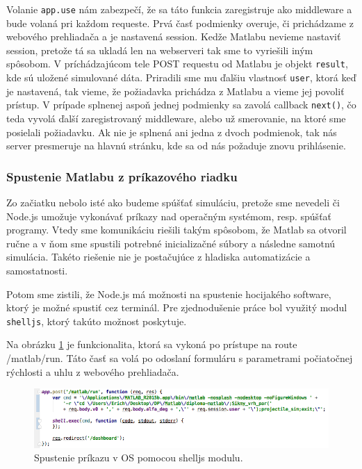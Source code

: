 Volanie \verb|app.use| nám zabezpečí, že sa táto funkcia zaregistruje ako middleware a bude volaná pri každom requeste. Prvá časť podmienky overuje, či prichádzame z webového prehliadača a je nastavená session. Kedže Matlabu nevieme nastaviť session, pretože tá sa ukladá len na webserveri tak sme to vyriešili iným spôsobom. V príchádzajúcom tele POST requestu od Matlabu je objekt \verb|result|, kde sú uložené simulované dáta. Priradili sme mu ďalšiu vlastnosť \verb|user|, ktorá keď je nastavená, tak vieme, že požiadavka prichádza z Matlabu a vieme jej povoliť prístup. V prípade splnenej aspoň jednej podmienky sa zavolá callback \verb|next()|, čo teda vyvolá ďalší zaregistrovaný middleware, alebo už smerovanie, na ktoré sme posielali požiadavku.
Ak nie je splnená ani jedna z dvoch podmienok, tak nás server presmeruje na hlavnú stránku, kde sa od nás požaduje znovu prihlásenie.


\subsubsection{Spustenie Matlabu z príkazového riadku}
Zo začiatku nebolo isté ako budeme spúšťať simuláciu, pretože sme nevedeli či Node.js umožuje vykonávať príkazy nad operačným systémom, resp. spúšťať programy. Vtedy sme komunikáciu riešili takým spôsobom, že Matlab sa otvoril ručne a v ňom sme spustili potrebné inicializačné súbory a následne samotnú simulácia. Takéto riešenie nie je postačujúce z hladiska automatizácie a samostatnosti.

Potom sme zistili, že Node.js má možnosti na spustenie hocijakého software, ktorý je možné spustiť cez terminál. Pre zjednodušenie práce bol využitý modul \verb|shelljs|, ktorý takúto možnost poskytuje.

Na obrázku \ref{img-express-shelljs} je funkcionalita, ktorá sa vykoná po prístupe na route /matlab/run. Táto časť sa volá po odoslaní formuláru s parametrami počiatočnej rýchlosti a uhlu z webového prehliadača.

\begin{figure}[H]
  \centering
  \includegraphics[scale=0.6]{img/code/express-shelljs.png}
  \caption{Spustenie príkazu v OS pomocou shelljs modulu.}
  \label{img-express-shelljs}
\end{figure}

